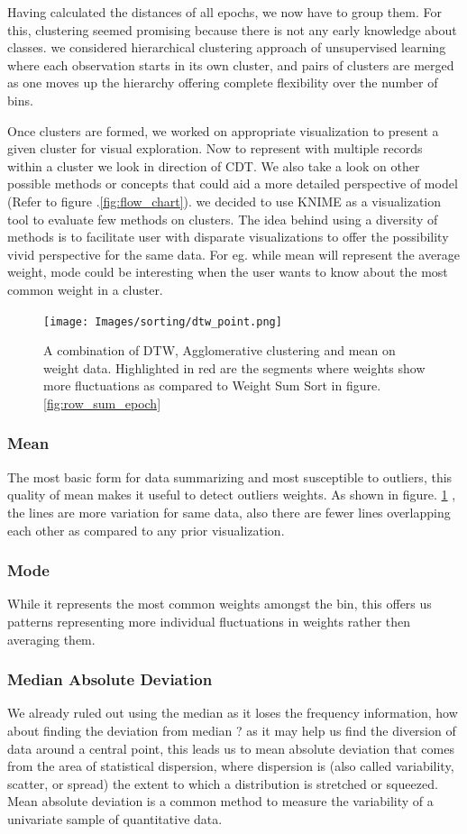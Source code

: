 \documentclass[journal]{vgtc}                %
\begin{document}
Having calculated the distances of all epochs, we now have to group them. For this, clustering seemed promising because there is not any early knowledge about classes. 
we considered hierarchical clustering approach of unsupervised learning where each observation starts in its own cluster, and pairs of clusters are merged as one moves up the hierarchy offering complete flexibility over the number of bins.

Once clusters are formed, we worked on appropriate visualization to present a given cluster for visual exploration.
Now to represent with multiple records within a cluster we look in direction of CDT.
We also take a look on other possible methods or concepts that could aid a more detailed perspective of model (Refer to figure .\ref{fig:flow_chart}).
we decided to use KNIME as a visualization tool to evaluate few methods on clusters.
The idea behind using a diversity of methods is to facilitate user with disparate visualizations to offer the possibility vivid perspective for the same data. For eg. while mean will represent the average weight, mode could be interesting when the user wants to know about the most common weight in a cluster. 

\begin{figure}
    \texttt{[image: Images/sorting/dtw\_point.png]}
    \caption{A combination of DTW, Agglomerative clustering and mean on weight data.
    Highlighted in red are the segments where weights show more fluctuations as compared to Weight Sum Sort in figure. \ref{fig:row_sum_epoch}}
    \label{fig:dtw_agl_mean}
\end{figure}
\subsubsection{Mean }
The most basic form for data summarizing and most susceptible to outliers, this quality of mean makes it useful to detect outliers weights. As shown in figure. \ref{fig:dtw_agl_mean} , the lines are more variation for same data, also there are fewer lines overlapping each other as compared to any prior visualization.

\subsubsection{Mode }
While it represents the most common weights amongst the bin, this offers us patterns representing more individual fluctuations in weights rather then averaging them.

\subsubsection{Median Absolute Deviation}
We already ruled out using the median as it loses the frequency information,  how about finding the deviation from median ? as it may help us find the diversion of data around a central point, this leads us to mean absolute deviation that comes from the area of statistical dispersion, where dispersion is (also called variability, scatter, or spread)  the extent to which a distribution is stretched or squeezed. Mean absolute deviation is a common method to measure the variability of a univariate sample of quantitative data.
\end{document}

